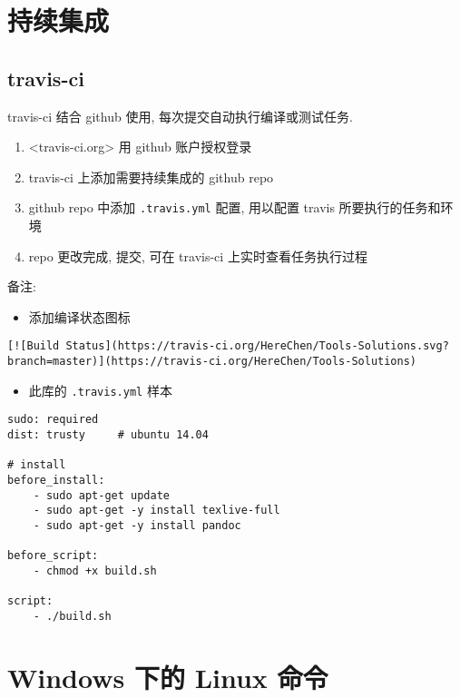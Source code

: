 \section{持续集成}\label{ux6301ux7eedux96c6ux6210}

\subsection{travis-ci}\label{travis-ci}

travis-ci 结合 github 使用, 每次提交自动执行编译或测试任务.

\begin{enumerate}
\def\labelenumi{\arabic{enumi}.}
\tightlist
\item
  \textless{}travis-ci.org\textgreater{} 用 github 账户授权登录
\item
  travis-ci 上添加需要持续集成的 github repo
\item
  github repo 中添加 \texttt{.travis.yml} 配置, 用以配置 travis
  所要执行的任务和环境
\item
  repo 更改完成, 提交, 可在 travis-ci 上实时查看任务执行过程
\end{enumerate}

备注:

\begin{itemize}
\tightlist
\item
  添加编译状态图标
\end{itemize}

\begin{verbatim}
[![Build Status](https://travis-ci.org/HereChen/Tools-Solutions.svg?branch=master)](https://travis-ci.org/HereChen/Tools-Solutions)
\end{verbatim}

\begin{itemize}
\tightlist
\item
  此库的 \texttt{.travis.yml} 样本
\end{itemize}

\begin{verbatim}
sudo: required
dist: trusty     # ubuntu 14.04

# install
before_install:
    - sudo apt-get update
    - sudo apt-get -y install texlive-full
    - sudo apt-get -y install pandoc

before_script:
    - chmod +x build.sh

script:
    - ./build.sh
\end{verbatim}

\section{Windows 下的 Linux
命令}\label{windows-ux4e0bux7684-linux-ux547dux4ee4}

